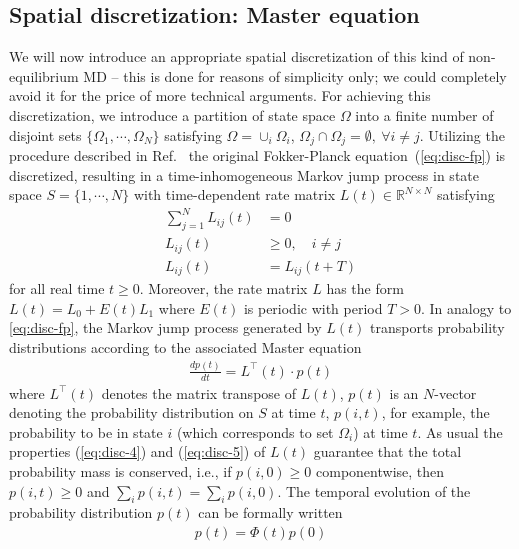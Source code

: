 \documentclass[journal=jctcce,manuscript=article]{achemso}
\newcommand{\vect}[1]{#1}
\newcommand{\myphi}{\Phi}
\begin{document}
\subsection{Spatial discretization: Master equation}
We will now introduce an appropriate spatial discretization of this kind of non-equilibrium MD --  this is done for reasons of simplicity only; we could completely avoid it for the price of more technical arguments.
For achieving this discretization, we 
introduce a partition of state space $\Omega$ into a finite number of disjoint
sets $\{ \Omega_1, \cdots, \Omega_N\}$ satisfying $\Omega = \cup_i \Omega_i$,
$\Omega_j\cap \Omega_j = \emptyset,\ \forall i\neq j$.
Utilizing the procedure described in Ref.~\cite{latorre2011structure} the original Fokker-Planck equation~(\ref{eq:disc-fp})
is discretized, resulting in a time-inhomogeneous Markov jump process in state
space $S = \{1, \cdots, N\}$ with time-dependent rate
matrix $\vect L(t) \in \mathbb R^{N\times N}$ satisfying
\begin{align}\label{eq:disc-4}
\sum\limits_{j=1}^N L_{ij}(t) & =  0\\ \label{eq:disc-5}
L_{ij}(t) & \ge  0, \quad i\not= j\\
L_{ij}(t) & =  L_{ij}(t+T)
\end{align}
for all real time $t\geq 0$.
Moreover, the rate matrix $L$ has the form $\vect L(t)=\vect L_0+E(t)\vect L_1$
where $E(t)$ is periodic with period $T>0$.
In analogy to \eqref{eq:disc-fp}, the Markov jump process generated by
$\vect L(t)$ transports probability distributions according to the associated Master equation
\begin{align}
  \label{eq:disc-master}
  \frac{d\vect p(t)}{dt} = \vect L^{\top}(t)\cdot \vect p(t)
\end{align}
where $\vect L^{\top}(t)$ denotes the matrix transpose of $\vect L(t)$, $\vect p(t)$ is an $N$-vector denoting the probability distribution on $S$ at time $t$, $p(i,t)$, for example, the probability to be in state $i$ (which corresponds to set $\Omega_i$) at time $t$.
As usual the properties (\ref{eq:disc-4}) and (\ref{eq:disc-5}) of
$\vect L(t)$ guarantee that the total probability mass is conserved,
i.e., if $p(i,0)\ge 0$ componentwise, then $p(i,t)\ge 0$ and $\sum_i
p(i,t) = \sum_ip(i,0)$.
The temporal evolution of the probability distribution $\vect p(t)$ can be formally written
\begin{align}  \label{eq:disc-8}
\vect p(t)=\myphi(t)\vect p(0)
\end{align}
\end{document}
